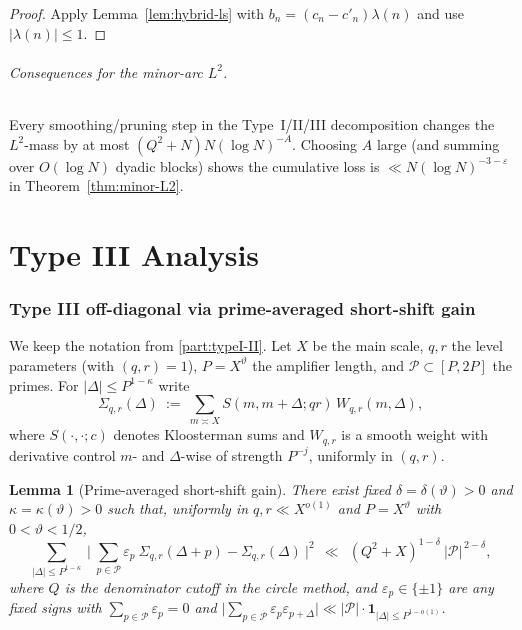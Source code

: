 \documentclass[11pt]{article}
\newtheorem{lemma}{Lemma}[part]
\theoremstyle{definition}
\theoremstyle{remark}
\numberwithin{equation}{part}
\begin{document}
\begin{proof}
	Apply Lemma~\ref{lem:hybrid-ls} with $b_n=(c_n-c'_n)\lambda(n)$ and use $|\lambda(n)|\le1$.
\end{proof}

\paragraph{Consequences for the minor-arc $L^2$.}
Every smoothing/pruning step in the Type~I/II/III decomposition changes the $L^2$-mass by at most $(Q^2+N)N(\log N)^{-A}$. Choosing $A$ large (and summing over $O(\log N)$ dyadic blocks) shows the cumulative loss is $\ll N(\log N)^{-3-\varepsilon}$ in Theorem~\ref{thm:minor-L2}.


\part{Type III Analysis}

\section{Type III off-diagonal via prime-averaged short-shift gain}\label{sec:typeIII-SSG}

We keep the notation from \ref{part:typeI-II}. Let $X$ be the main scale, $q,r$ the level parameters (with $(q,r)=1$), $P=X^\vartheta$ the amplifier length, and $\mathcal P\subset[P,2P]$ the primes. For $|\Delta|\le P^{1-\kappa}$ write
\[
	\Sigma_{q,r}(\Delta)\ :=\ \sum_{m\asymp X} S(m,m+\Delta;qr)\,W_{q,r}(m,\Delta),
\]
where $S(\cdot,\cdot;c)$ denotes Kloosterman sums and $W_{q,r}$ is a smooth weight with derivative control $m$- and $\Delta$-wise of strength $P^{-j}$, uniformly in $(q,r)$.

\begin{lemma}[Prime-averaged short-shift gain]\label{lem:passg}
	There exist fixed $\delta=\delta(\vartheta)>0$ and $\kappa=\kappa(\vartheta)>0$ such that, uniformly in $q,r\ll X^{o(1)}$ and $P=X^\vartheta$ with $0<\vartheta<1/2$,
	\[
		\sum_{|\Delta|\le P^{1-\kappa}}\ \Big|\ \sum_{p\in\mathcal P}\varepsilon_p\ \Sigma_{q,r}(\Delta+p)-\Sigma_{q,r}(\Delta)\ \Big|^2
		\ \ \ll\ \ (Q^2+X)^{1-\delta}\ |\mathcal P|^{\,2-\delta},
	\]
	where $Q$ is the denominator cutoff in the circle method, and $\varepsilon_p\in\{\pm1\}$ are any fixed signs with $\sum_{p\in\mathcal P}\varepsilon_p=0$ and $\big|\sum_{p\in\mathcal P}\varepsilon_p\varepsilon_{p+\Delta}\big|\ll |\mathcal P|\cdot \mathbf{1}_{|\Delta|\le P^{1-o(1)}}$.
\end{lemma}
\end{document}
